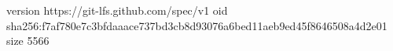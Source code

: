 version https://git-lfs.github.com/spec/v1
oid sha256:f7af780e7c3bfdaaace737bd3cb8d93076a6bed11aeb9ed45f8646508a4d2e01
size 5566

